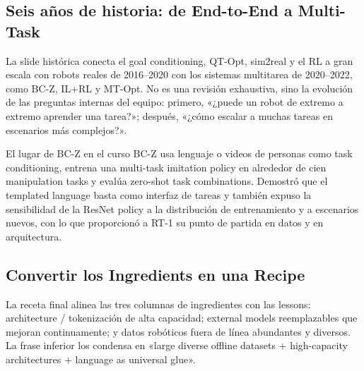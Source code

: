 \subsection{Seis años de historia: de End-to-End a Multi-Task}

La slide histórica conecta el goal conditioning, QT-Opt, sim2real y el RL a gran escala con robots reales de 2016--2020 con los sistemas multitarea de 2020--2022, como BC-Z, IL+RL y MT-Opt. No es una revisión exhaustiva, sino la evolución de las preguntas internas del equipo: primero, «¿puede un robot de extremo a extremo aprender una tarea?»; después, «¿cómo escalar a muchas tareas en escenarios más complejos?».




\begin{knowledgebox}{El lugar de BC-Z en el curso}
BC-Z usa lenguaje o videos de personas como task conditioning, entrena una multi-task imitation policy en alrededor de cien manipulation tasks y evalúa zero-shot task combinations. Demostró que el templated language basta como interfaz de tareas y también expuso la sensibilidad de la ResNet policy a la distribución de entrenamiento y a escenarios nuevos, con lo que proporcionó a RT-1 su punto de partida en datos y en arquitectura.
\end{knowledgebox}

\subsection{Convertir los Ingredients en una Recipe}

La receta final alinea las tres columnas de ingredientes con las lessons: architecture / tokenización de alta capacidad; external models reemplazables que mejoran continuamente; y datos robóticos fuera de línea abundantes y diversos. La frase inferior los condensa en «large diverse offline datasets + high-capacity architectures + language as universal glue».

